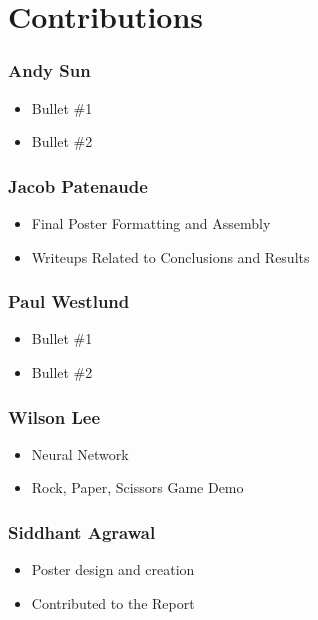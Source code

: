 \section{Contributions}

\subsubsection*{Andy Sun}
\begin{itemize}
\item Bullet \#1
\item Bullet \#2
\end{itemize}

\subsubsection*{Jacob Patenaude}
\begin{itemize}
\item Final Poster Formatting and Assembly
\item Writeups Related to Conclusions and Results
\end{itemize}

\subsubsection*{Paul Westlund}
\begin{itemize}
\item Bullet \#1
\item Bullet \#2
\end{itemize}

\subsubsection*{Wilson Lee}
\begin{itemize}
\item Neural Network
\item Rock, Paper, Scissors Game Demo
\end{itemize}

\subsubsection*{Siddhant Agrawal}
\begin{itemize}
\item Poster design and creation
\item Contributed to the Report
\end{itemize}
